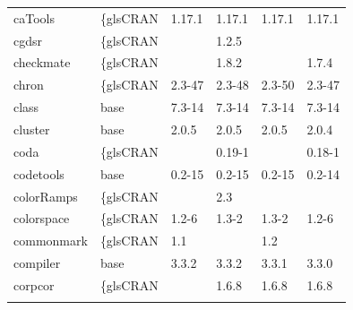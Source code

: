 \begin{longtable}{llllll}
\rowcolor{black!5}
caTools                       & \{gls{CRAN}                      & 1.17.1      & 1.17.1      & 1.17.1         & 1.17.1             \\
\rowcolor{black!10}
cgdsr                         & \{gls{CRAN}                      &             & 1.2.5       &                &                   \\
\rowcolor{black!5}
checkmate                     & \{gls{CRAN}                      &             & 1.8.2       &                & 1.7.4              \\
\rowcolor{black!10}
chron                         & \{gls{CRAN}                      & 2.3-47      & 2.3-48      & 2.3-50         & 2.3-47            \\
\rowcolor{black!5}
class                         & base                      & 7.3-14      & 7.3-14      & 7.3-14         & 7.3-14             \\
\rowcolor{black!10}
cluster                       & base                      & 2.0.5       & 2.0.5       & 2.0.5          & 2.0.4             \\
\rowcolor{black!5}
coda                          & \{gls{CRAN}                      &             & 0.19-1      &                & 0.18-1             \\
\rowcolor{black!10}
codetools                     & base                      & 0.2-15      & 0.2-15      & 0.2-15         & 0.2-14            \\
\rowcolor{black!5}
colorRamps                    & \{gls{CRAN}                      &             & 2.3         &                &                    \\
\rowcolor{black!10}
colorspace                    & \{gls{CRAN}                      & 1.2-6       & 1.3-2       & 1.3-2          & 1.2-6             \\
\rowcolor{black!5}
commonmark                    & \{gls{CRAN}                      & 1.1         &             & 1.2            &                    \\
\rowcolor{black!10}
compiler                      & base                      & 3.3.2       & 3.3.2       & 3.3.1          & 3.3.0             \\
\rowcolor{black!5}
corpcor                       & \{gls{CRAN}                      &             & 1.6.8       & 1.6.8          & 1.6.8              \\
\rowcolor{black!10}

\end{longtable}
